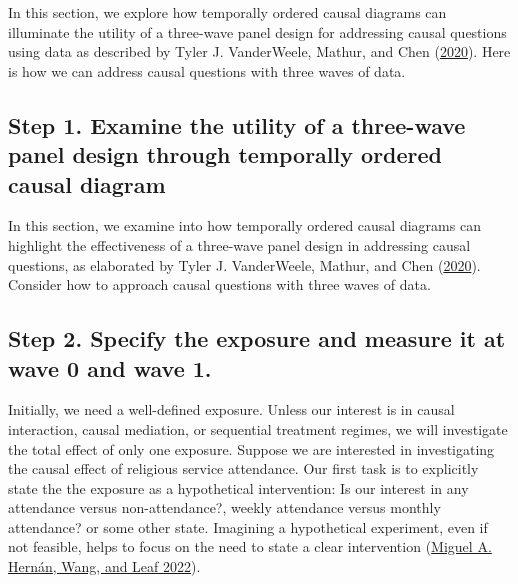 \documentclass[
  singlecolumn]{report}
\begin{document}
In this section, we explore how temporally ordered causal diagrams can
illuminate the utility of a three-wave panel design for addressing
causal questions using data as described by Tyler J. VanderWeele,
Mathur, and Chen (\protect\hyperlink{ref-vanderweele2020}{2020}). Here
is how we can address causal questions with three waves of data.

\hypertarget{step-1.-examine-the-utility-of-a-three-wave-panel-design-through-temporally-ordered-causal-diagram}{%
\subsection{Step 1. Examine the utility of a three-wave panel design
through temporally ordered causal
diagram}\label{step-1.-examine-the-utility-of-a-three-wave-panel-design-through-temporally-ordered-causal-diagram}}

In this section, we examine into how temporally ordered causal diagrams
can highlight the effectiveness of a three-wave panel design in
addressing causal questions, as elaborated by Tyler J. VanderWeele,
Mathur, and Chen (\protect\hyperlink{ref-vanderweele2020}{2020}).
Consider how to approach causal questions with three waves of data.

\hypertarget{step-2.-specify-the-exposure-and-measure-it-at-wave-0-and-wave-1.}{%
\subsection{Step 2. Specify the exposure and measure it at wave 0 and
wave
1.}\label{step-2.-specify-the-exposure-and-measure-it-at-wave-0-and-wave-1.}}

Initially, we need a well-defined exposure. Unless our interest is in
causal interaction, causal mediation, or sequential treatment regimes,
we will investigate the total effect of only one exposure. Suppose we
are interested in investigating the causal effect of religious service
attendance. Our first task is to explicitly state the the exposure as a
hypothetical intervention: Is our interest in any attendance versus
non-attendance?, weekly attendance versus monthly attendance? or some
other state. Imagining a hypothetical experiment, even if not feasible,
helps to focus on the need to state a clear intervention
(\protect\hyperlink{ref-hernuxe1n2022a}{Miguel A. Hernán, Wang, and Leaf
2022}).
\end{document}
